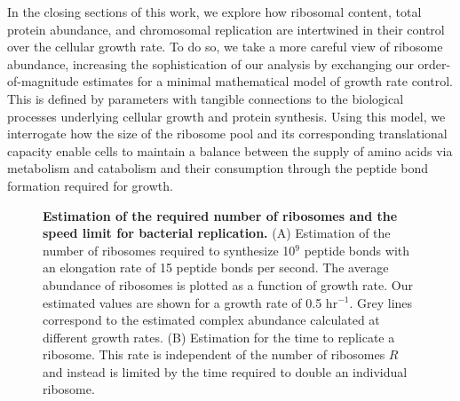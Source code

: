 In the closing sections of this work, we explore how ribosomal content, total
protein abundance, and chromosomal replication are intertwined in their control
over the cellular growth rate. To do so, we take a more careful view of ribosome
abundance, increasing the sophistication of our analysis by exchanging our order-of-magnitude estimates for a minimal
mathematical model of growth rate control. This is defined by parameters with
tangible connections to the biological processes underlying cellular growth and
protein synthesis. Using this model, we interrogate how the size of the ribosome
pool and its corresponding translational capacity enable cells to maintain a
balance  between the supply of amino acids via metabolism and catabolism and their
consumption through the peptide bond formation required for growth.

\begin{figure}
        \caption{\textbf{Estimation of the required number of ribosomes and the
        speed limit for bacterial replication.} (A) Estimation of the
        number of ribosomes required to synthesize 10$^9$ peptide bonds with an
        elongation rate of 15 peptide bonds per second. The
        average abundance of ribosomes is plotted as a function of growth rate.
        Our estimated values are shown for a growth rate of 0.5 hr$^{-1}$.
        Grey lines correspond to the estimated complex abundance calculated at
        different growth rates. (B) Estimation for the time to replicate a
        ribosome. This rate is independent of the number of ribosomes $R$ and instead is limited by the time required to
        double an individual ribosome.} \label{fig:protein_synthesis}


\end{figure}
